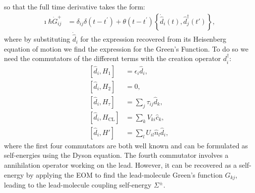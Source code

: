 \documentclass{article}
\begin{document}
\begin{multicols}{2}
        so that the full time derivative takes the form:
        \begin{align}
        \imath\hbar \dot{G}_{ij}^+ &= \delta_{ij} \delta(t - t^\prime) + \theta(t-t^\prime) \left\{ \dot{\hat{d}}_i (t), \hat{d}_j^\dagger (t')\right\},
        \label{eq:eomgf} 
        \end{align} where by substituting $\dot{\hat{d}}_i$ for the expression recovered from its Heisenberg equation of motion we find the expression for the Green's Function. To do so we need the commutators of the different terms with the creation operator $d^\dagger_i$:
        \begin{align*}
            \left[ \hat{d}_i, H_1 \right] &= \epsilon_i \hat{d}_i, \\
            \left[ \hat{d}_i, H_2 \right] &= 0, \\
            \left[ \hat{d}_i, H_\tau \right] &= \sum_j \tau_{ij} \hat{d}_k, \\
            \left[ \hat{d}_i, H_\text{CL} \right] &= \sum_k V_{ki} \hat{c}_k,\\
            \left[ \hat{d}_i, H' \right] &= \sum_l U_{il} \hat{n}_l \hat{d}_i,
        \end{align*}
        where the first four commutators are both well known and can be formulated as self-energies using the Dyson equation. The fourth commutator involves a annihilation operator working on the lead. However, it can be recovered as a self-energy by applying the EOM to find the lead-molecule Green's function $G_{kj}$, leading to the lead-molecule coupling self-energy $\Sigma^\pm$.        
        

\end{multicols}
\end{document}
